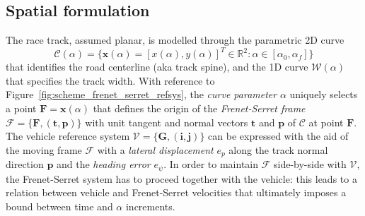 \documentclass[conference]{IEEEtran} %
\renewcommand{\vec}[1]{\boldsymbol{#1}}
\DeclarePairedDelimiter{\norm}{\lVert}{\rVert}
\begin{document}
\subsection{Spatial formulation}

The race track, assumed planar, is modelled through the parametric 2D curve
\begin{equation}
\mathcal C(\alpha) = \{ \vec x (\alpha) = [x(\alpha), y(\alpha)]^T \in \mathbb{R}^2 : \alpha \in [\alpha_0, \alpha_f] \}
\end{equation}
%
that identifies the road centerline (aka track spine), and the 1D curve $\mathcal W(\alpha)$ that specifies the track width.
With reference to Figure~\ref{fig:scheme_frenet_serret_refsys}, the \emph{curve parameter} $\alpha$ uniquely selects a point $\vec F = \vec x(\alpha)$ that defines the origin of the \emph{Frenet-Serret frame} $\mathcal F = \{ \vec F, (\vec t, \vec p) \}$ with unit tangent and normal vectors $\vec t$ and $\vec p$ of $\mathcal C$ at point $\vec F$.
%
The vehicle reference system $\mathcal V = \{ \vec G, (\vec i, \vec j) \}$ can be expressed with the aid of the moving frame $\mathcal F$ with a \emph{lateral displacement} $e_p$ along the track normal direction $\vec p$ and the \emph{heading error} $e_\psi$.
In order to maintain $\mathcal F$ side-by-side with $\mathcal V$, the Frenet-Serret system has to proceed together with the vehicle: this leads to a relation between vehicle and Frenet-Serret velocities that ultimately imposes a bound between time and $\alpha$ increments.

%
\end{document}
